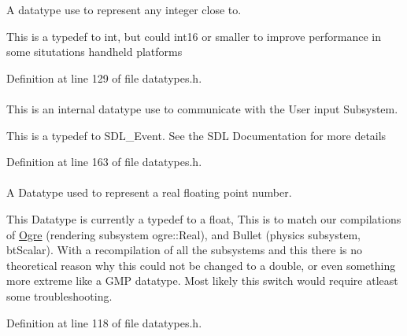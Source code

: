 A datatype use to represent any integer close to. 

This is a typedef to int, but could int16 or smaller to improve performance in some situtations handheld platforms 

Definition at line 129 of file datatypes.h.

\hypertarget{namespaceMezzanine_ae8d4c0ab783af89a250b0225b75753e5}{
\paragraph[{RawEvent}]{}\hfill}
\label{namespaceMezzanine_ae8d4c0ab783af89a250b0225b75753e5}


This is an internal datatype use to communicate with the User input Subsystem. 

This is a typedef to SDL\_\-Event. See the SDL Documentation for more details 

Definition at line 163 of file datatypes.h.

\hypertarget{namespaceMezzanine_a726731b1a7df72bf3583e4a97282c6f6}{
\paragraph[{Real}]{}\hfill}
\label{namespaceMezzanine_a726731b1a7df72bf3583e4a97282c6f6}


A Datatype used to represent a real floating point number. 

This Datatype is currently a typedef to a float, This is to match our compilations of \hyperlink{namespaceOgre}{Ogre} (rendering subsystem ogre::Real), and Bullet (physics subsystem, btScalar). With a recompilation of all the subsystems and this there is no theoretical reason why this could not be changed to a double, or even something more extreme like a GMP datatype. Most likely this switch would require atleast some troubleshooting. 

Definition at line 118 of file datatypes.h.

\hypertarget{namespaceMezzanine_acf9fcc130e6ebf08e3d8491aebcf1c86}{
\paragraph[{String}]{}\hfill}
\label{namespaceMezzanine_acf9fcc130e6ebf08e3d8491aebcf1c86}


